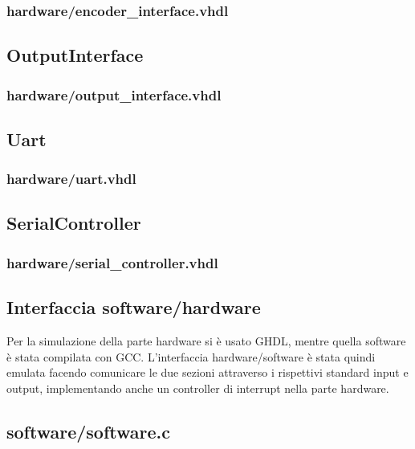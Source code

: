 \documentclass [11pt,a4paper,oneside]{article}
\begin{document}
\subsubsection{hardware/encoder\_interface.vhdl}


\subsection{OutputInterface}
\subsubsection{hardware/output\_interface.vhdl}


\subsection{Uart}
\subsubsection{hardware/uart.vhdl}


\subsection{SerialController}
\subsubsection{hardware/serial\_controller.vhdl}


\subsection{Interfaccia software/hardware}
Per la simulazione della parte hardware si è usato GHDL, mentre quella software
è stata compilata con GCC. L'interfaccia hardware/software è stata quindi emulata
facendo comunicare le due sezioni attraverso i rispettivi standard input e output,
implementando anche un controller di interrupt nella parte hardware.

\subsection{software/software.c}

\end{document}
